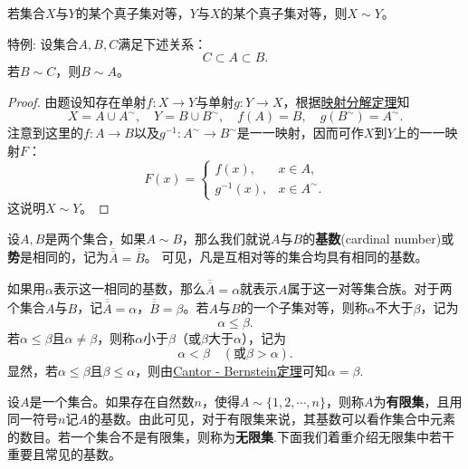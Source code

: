 \documentclass[../../main.tex]{subfiles}
\begin{document}
\begin{theorem}\label{theorem:Cantor - Bernstein定理}
若集合\(X\)与\(Y\)的某个真子集对等，\(Y\)与\(X\)的某个真子集对等，则\(X\sim Y\)。
\end{theorem}
\begin{note}
  特例:
设集合\(A,B,C\)满足下述关系：
\[C\subset A\subset B.\]
若\(B\sim C\)，则\(B\sim A\)。
\end{note}
\begin{proof}
  由题设知存在单射\(f:X\rightarrow Y\)与单射\(g:Y\rightarrow X\)，根据\hyperref[lemma:映射分解定理]{映射分解定理}知
\[X = A\cup A^{\sim}, \quad Y = B\cup B^{\sim}, \quad f(A) = B, \quad g(B^{\sim}) = A^{\sim}.\]
注意到这里的\(f:A\rightarrow B\)以及\(g^{-1}:A^{\sim}\rightarrow B^{\sim}\)是一一映射，因而可作\(X\)到\(Y\)上的一一映射\(F\)：
\[F(x)=
\begin{cases}
f(x), & x\in A, \\
g^{-1}(x), & x\in A^{\sim}.
\end{cases}
\]
这说明\(X\sim Y\)。

\end{proof}

\begin{definition}[集合的基数(或势)]\label{definition:集合的基数(或势)}
  设\(A,B\)是两个集合，如果\(A\sim B\)，那么我们就说\(A\)与\(B\)的\textbf{基数}(cardinal number)或\textbf{势}是相同的，记为\(\overline{\overline{A}}=\overline{\overline{B}}\)。
  可见，凡是互相对等的集合均具有相同的基数。
  
  如果用\(\alpha\)表示这一相同的基数，那么\(\overline{\overline{A}}=\alpha\)就表示\(A\)属于这一对等集合族。对于两个集合\(A\)与\(B\)，记\(\overline{\overline{A}}=\alpha\)，\(\overline{\overline{B}}=\beta\)。若\(A\)与\(B\)的一个子集对等，则称\(\alpha\)不大于\(\beta\)，记为
\[\alpha\leqslant\beta.\]
若\(\alpha\leqslant\beta\)且\(\alpha\neq\beta\)，则称\(\alpha\)小于\(\beta\)（或\(\beta\)大于\(\alpha\)），记为
\[\alpha<\beta\quad(\text{或}\beta>\alpha).\]
显然，若\(\alpha\leqslant\beta\)且\(\beta\leqslant\alpha\)，则由\hyperref[theorem:Cantor - Bernstein定理]{Cantor - Bernstein定理}可知\(\alpha=\beta\).
\end{definition}

\begin{definition}[有限集与无限集]\label{definition:有限集与无限集}
设\(A\)是一个集合。如果存在自然数\(n\)，使得\(A\sim\{1,2,\cdots,n\}\)，则称\(A\)为\textbf{有限集}，且用同一符号\(n\)记\(A\)的基数。由此可见，对于有限集来说，其基数可以看作集合中元素的数目。若一个集合不是有限集，则称为\textbf{无限集}.下面我们着重介绍无限集中若干重要且常见的基数。
\end{definition}
\end{document}
